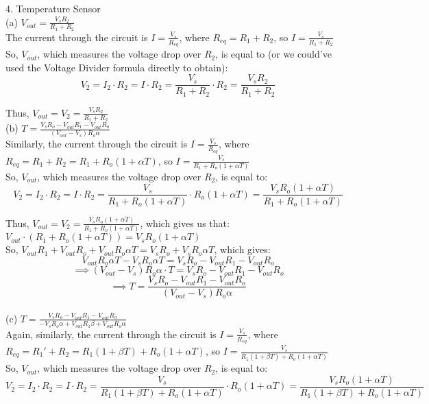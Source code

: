 \documentclass{article}
\begin{document}
{\Large 4. Temperature Sensor} \\[.5cm]
{\large (a) $V_{out} = \frac{V_s R_2}{R_1 + R_2}$} \\

The current through the circuit is $I = \frac{V_s}{R_{eq}}$, where $R_{eq} = R_1 + R_2$, so $I = \frac{V_s}{R_1 + R_2}$ \\

So, $V_{out}$, which measures the voltage drop over $R_2$, is equal to (or we could've used the Voltage Divider formula directly to obtain):
$$V_2 = I_2\cdot R_2 = I\cdot R_2 = \frac{V_s}{R_1 + R_2}\cdot R_2 = \frac{V_s R_2}{R_1 + R_2}$$

Thus, $V_{out} = V_2 = \frac{V_s R_2}{R_1 + R_2}$ \\[.5cm]
{\large (b) $T = \frac{V_sR_o - V_{out}R_1 - V_{out}R_o}{(V_{out}-V_s)R_o\alpha}$} \\

Similarly, the current through the circuit is $I = \frac{V_s}{R_{eq}}$, where $R_{eq} = R_1 + R_2 = R_1 + R_o(1+\alpha T)$, so $I = \frac{V_s}{R_1 + R_o(1+\alpha T)}$ \\

So, $V_{out}$, which measures the voltage drop over $R_2$, is equal to:
$$V_2 = I_2\cdot R_2 = I\cdot R_2 = \frac{V_s}{R_1 + R_o(1+\alpha T)}\cdot R_o(1+\alpha T) = \frac{V_s R_o(1+\alpha T)}{R_1 + R_o(1+\alpha T)}$$

Thus, $V_{out} = V_2 = \frac{V_s R_o(1+\alpha T)}{R_1 + R_o(1+\alpha T)}$, which gives us that: $V_{out}\cdot (R_1 + R_o(1+\alpha T)) = V_s R_o(1+\alpha T)$ \\

So, $V_{out}R_1 + V_{out}R_o + V_{out}R_o\alpha T = V_sR_o + V_sR_o\alpha T$, which gives:
$$V_{out}R_o\alpha T - V_sR_o\alpha T = V_sR_o - V_{out}R_1 - V_{out}R_o$$
$$\implies (V_{out}-V_s)R_o\alpha\cdot T = V_sR_o - V_{out}R_1 - V_{out}R_o$$
$$\implies T = \frac{V_sR_o - V_{out}R_1 - V_{out}R_o}{(V_{out}-V_s)R_o\alpha}$$ \\
{\large (c) $T = \frac{V_sR_o - V_{out}R_1 - V_{out}R_o}{- V_sR_o\alpha + V_{out}R_1\beta + V_{out}R_o\alpha}$} \\

Again, similarly, the current through the circuit is $I = \frac{V_s}{R_{eq}}$, where $R_{eq} = R_1' + R_2 = R_1(1+\beta T) + R_o(1+\alpha T)$, so $I = \frac{V_s}{R_1(1+\beta T) + R_o(1+\alpha T)}$ \\

So, $V_{out}$, which measures the voltage drop over $R_2$, is equal to:
$$V_2 = I_2\cdot R_2 = I\cdot R_2 = \frac{V_s}{R_1(1+\beta T) + R_o(1+\alpha T)}\cdot R_o(1+\alpha T) = \frac{V_s R_o(1+\alpha T)}{R_1(1+\beta T) + R_o(1+\alpha T)}$$
\end{document}

